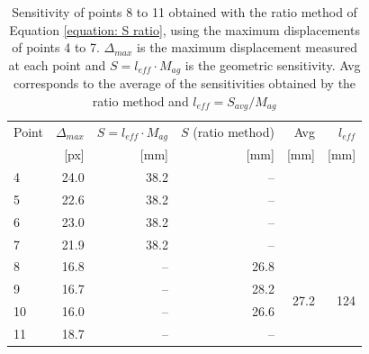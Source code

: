 \begin{table}[h]
    \centering
    \caption[Sensitivity by displacement ratio for the in-focus points, with freestream]{Sensitivity of points 8 to 11 obtained with the ratio method of Equation \ref{equation: S ratio}, using the maximum displacements of points 4 to 7. $\Delta_{max}$ is the maximum displacement measured at each point and $S = l_{eff} \cdot M_{ag}$ is the geometric sensitivity. Avg corresponds to the average of the sensitivities obtained by the ratio method and $l_{eff} = S_{avg}/M_{ag}$}
    \label{tab: S ratio points 4 to 11}
    \begin{tabular}{lrrrrr}
        \toprule
        Point & $\Delta_{max}$ & $S = l_{eff} \cdot M_{ag}$ & $S$ (ratio method) & Avg & $l_{eff}$ \\
              & [px] & [mm] & [mm] & [mm] & [mm] \\
        \midrule
         4 & 24.0 & 38.2 & -- & & \\
         5 & 22.6 & 38.2 & -- & & \\
         6 & 23.0 & 38.2 & -- & & \\
         7 & 21.9 & 38.2 & -- & & \\
        \midrule
         8 & 16.8 & -- & 26.8 & \multirow{4}{*}{27.2} & \multirow{4}{*}{124} \\
         9 & 16.7 & -- & 28.2 & & \\
        10 & 16.0 & -- & 26.6 & & \\
        11 & 18.7 & -- & -- & & \\
        \bottomrule
    \end{tabular}
\end{table}

